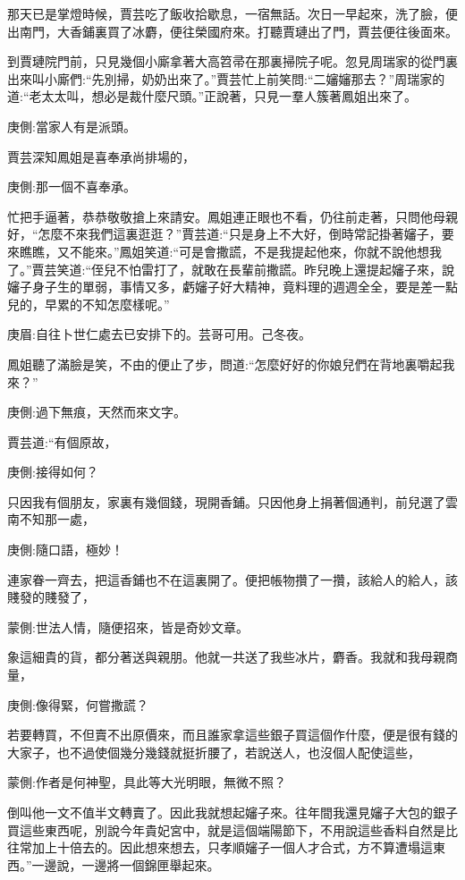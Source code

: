 \begin{parag}
    那天已是掌燈時候，賈芸吃了飯收拾歇息，一宿無話。次日一早起來，洗了臉，便出南門，大香鋪裏買了冰麝，便往榮國府來。打聽賈璉出了門，賈芸便往後面來。
\end{parag}


\begin{parag}
    到賈璉院門前，只見幾個小廝拿著大高笤帚在那裏掃院子呢。忽見周瑞家的從門裏出來叫小廝們:“先別掃，奶奶出來了。”賈芸忙上前笑問:“二嬸嬸那去？”周瑞家的道:“老太太叫，想必是裁什麼尺頭。”正說著，只見一羣人簇著鳳姐出來了。\begin{note}庚側:當家人有是派頭。\end{note}賈芸深知鳳姐是喜奉承尚排場的，\begin{note}庚側:那一個不喜奉承。\end{note}忙把手逼著，恭恭敬敬搶上來請安。鳳姐連正眼也不看，仍往前走著，只問他母親好，“怎麼不來我們這裏逛逛？”賈芸道:“只是身上不大好，倒時常記掛著嬸子，要來瞧瞧，又不能來。”鳳姐笑道:“可是會撒謊，不是我提起他來，你就不說他想我了。”賈芸笑道:“侄兒不怕雷打了，就敢在長輩前撒謊。昨兒晚上還提起嬸子來，說嬸子身子生的單弱，事情又多，虧嬸子好大精神，竟料理的週週全全，要是差一點兒的，早累的不知怎麼樣呢。”\begin{note}庚眉:自往卜世仁處去已安排下的。芸哥可用。己冬夜。\end{note}
\end{parag}


\begin{parag}
    鳳姐聽了滿臉是笑，不由的便止了步，問道:“怎麼好好的你娘兒們在背地裏嚼起我來？”\begin{note}庚側:過下無痕，天然而來文字。\end{note}賈芸道:“有個原故，\begin{note}庚側:接得如何？\end{note}只因我有個朋友，家裏有幾個錢，現開香鋪。只因他身上捐著個通判，前兒選了雲南不知那一處，\begin{note}庚側:隨口語，極妙！\end{note}連家眷一齊去，把這香鋪也不在這裏開了。便把帳物攢了一攢，該給人的給人，該賤發的賤發了，\begin{note}蒙側:世法人情，隨便招來，皆是奇妙文章。\end{note}象這細貴的貨，都分著送與親朋。他就一共送了我些冰片，麝香。我就和我母親商量，\begin{note}庚側:像得緊，何嘗撒謊？\end{note}若要轉買，不但賣不出原價來，而且誰家拿這些銀子買這個作什麼，便是很有錢的大家子，也不過使個幾分幾錢就挺折腰了，若說送人，也沒個人配使這些，\begin{note}蒙側:作者是何神聖，具此等大光明眼，無微不照？\end{note}倒叫他一文不值半文轉賣了。因此我就想起嬸子來。往年間我還見嬸子大包的銀子買這些東西呢，別說今年貴妃宮中，就是這個端陽節下，不用說這些香料自然是比往常加上十倍去的。因此想來想去，只孝順嬸子一個人才合式，方不算遭塌這東西。”一邊說，一邊將一個錦匣舉起來。
\end{parag}


